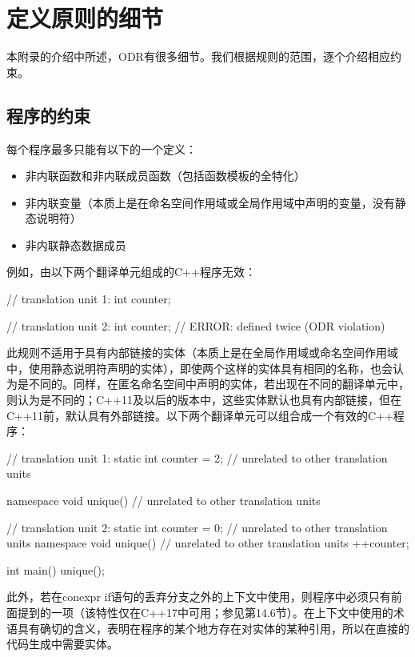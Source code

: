 \section{定义原则的细节}

本附录的介绍中所述，ODR有很多细节。我们根据规则的范围，逐个介绍相应约束。

\subsection{程序的约束}

每个程序最多只能有以下的一个定义：

\begin{itemize}
\item 
非内联函数和非内联成员函数（包括函数模板的全特化）

\item 
非内联变量（本质上是在命名空间作用域或全局作用域中声明的变量，没有静态说明符）

\item 
非内联静态数据成员
\end{itemize}

例如，由以下两个翻译单元组成的C++程序无效：

\begin{cpp}
// translation unit 1:
int counter;

// translation unit 2:
int counter; // ERROR: defined twice (ODR violation)
\end{cpp}

此规则不适用于具有内部链接的实体（本质上是在全局作用域或命名空间作用域中，使用静态说明符声明的实体），即使两个这样的实体具有相同的名称，也会认为是不同的。同样，在匿名命名空间中声明的实体，若出现在不同的翻译单元中，则认为是不同的；C++11及以后的版本中，这些实体默认也具有内部链接，但在C++11前，默认具有外部链接。以下两个翻译单元可以组合成一个有效的C++程序：

\begin{cpp}
// translation unit 1:
static int counter = 2; // unrelated to other translation units

namespace {
	void unique() // unrelated to other translation units
	{ }
}

// translation unit 2:
static int counter = 0; // unrelated to other translation units
namespace {
	void unique() // unrelated to other translation units
	{
		++counter;
	}
}

int main()
{
	unique();
}
\end{cpp}

此外，若在conexpr if语句的丢弃分支之外的上下文中使用，则程序中必须只有前面提到的一项（该特性仅在C++17中可用；参见第14.6节）。在上下文中使用的术语具有确切的含义，表明在程序的某个地方存在对实体的某种引用，所以在直接的代码生成中需要实体。

